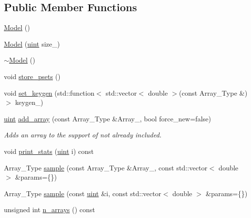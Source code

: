 \subsection*{Public Member Functions}
\begin{DoxyCompactItemize}
\item 
\hyperlink{class_model_a29e6e0c37d9a892772c5ee95ce1e1043}{Model} ()
\item 
\hyperlink{class_model_a46639bb435ca2992dac8858528a5362e}{Model} (\hyperlink{typedefs_8hpp_a91ad9478d81a7aaf2593e8d9c3d06a14}{uint} size\+\_\+)
\item 
\hyperlink{class_model_a0eba131af14e1ceefc7748323e9fb4bf}{$\sim$\+Model} ()
\item 
void \hyperlink{class_model_a06a6f52dfc6868908cf11e6663a93904}{store\+\_\+psets} ()
\item 
void \hyperlink{class_model_add1847cdaf3f5bbde6c14efc2e4d16df}{set\+\_\+keygen} (std\+::function$<$ std\+::vector$<$ double $>$(const Array\+\_\+\+Type \&)$>$ keygen\+\_\+)
\item 
\hyperlink{typedefs_8hpp_a91ad9478d81a7aaf2593e8d9c3d06a14}{uint} \hyperlink{class_model_a17a2205b52c03bb29eefb8fb126a01f6}{add\+\_\+array} (const Array\+\_\+\+Type \&Array\+\_\+, bool force\+\_\+new=false)
\begin{DoxyCompactList}\small\item\em Adds an array to the support of not already included. \end{DoxyCompactList}\item 
void \hyperlink{class_model_ac00b5c6a1446ad00fdf1d92c9cb1df3c}{print\+\_\+stats} (\hyperlink{typedefs_8hpp_a91ad9478d81a7aaf2593e8d9c3d06a14}{uint} i) const
\item 
Array\+\_\+\+Type \hyperlink{class_model_a59e37db45e1751a6205db129a5c114c1}{sample} (const Array\+\_\+\+Type \&Array\+\_\+, const std\+::vector$<$ double $>$ \&params=\{\})
\item 
Array\+\_\+\+Type \hyperlink{class_model_a86484783c8091b509335fefd9f22d6ae}{sample} (const \hyperlink{typedefs_8hpp_a91ad9478d81a7aaf2593e8d9c3d06a14}{uint} \&i, const std\+::vector$<$ double $>$ \&params=\{\})
\item 
unsigned int \hyperlink{class_model_ac3a9ef28d8b6b1e4dfae85816b111080}{n\+\_\+arrays} () const
\end{DoxyCompactItemize}
